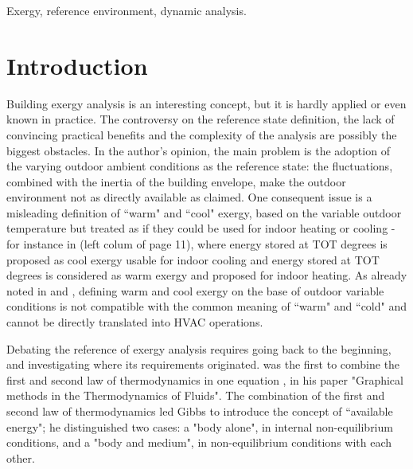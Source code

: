 \documentclass[10pt]{extarticle} %
\begin{document}
{\sffamily\normalsize Exergy, reference environment, dynamic analysis.}


\section{Introduction} 

\sffamily\normalsize


Building exergy analysis is an interesting concept, but it is hardly applied or even known in practice. The controversy on the reference state definition, the lack of convincing practical benefits and the complexity of the analysis are possibly the biggest obstacles. In the author's opinion, the main problem is the adoption of the varying outdoor ambient conditions as the reference state: the fluctuations, combined with the inertia of the building envelope, make the outdoor environment not as directly available as claimed. One consequent issue is a misleading definition of ``warm" and ``cool" exergy, based on the variable outdoor temperature but treated as if they could be used for indoor heating or cooling - for instance in \cite{Choi2020} (left colum of page 11), where energy stored at TOT degrees is proposed as cool exergy usable for indoor cooling and energy stored at TOT degrees is considered as warm exergy and proposed for indoor heating. As already noted in \citep{Bonetti2016} and \citep{Bonetti2017a}, defining warm and cool exergy on the base of outdoor variable conditions is not compatible with the common meaning of ``warm" and ``cold" and cannot be directly translated into HVAC operations.
\vskip2cm
%
%
%


Debating the reference of exergy analysis requires going back to the beginning, and investigating where its requirements originated. 
\cite{Gibbs1873} was the first to combine the first and second law of thermodynamics in one equation \citep{Klein1990}, in his paper "Graphical methods in the Thermodynamics of Fluids".  The combination of the first and second law of thermodynamics led Gibbs to introduce the concept of ``available energy"; he distinguished two cases: a "body alone", in internal non-equilibrium conditions, and a "body and medium", in non-equilibrium conditions with each other. 
\end{document}
